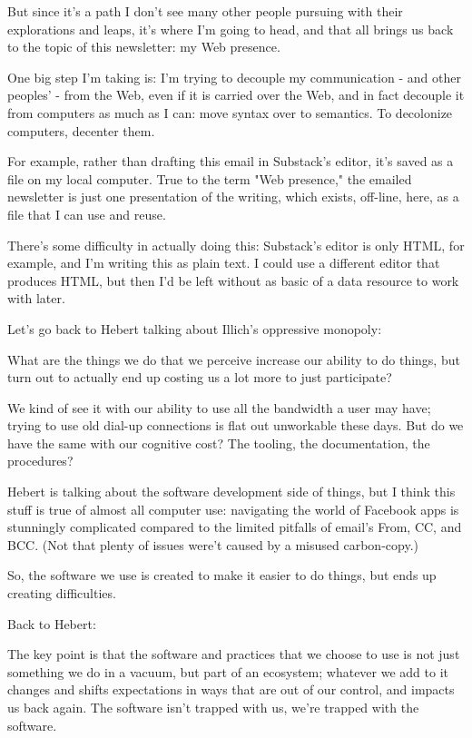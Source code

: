 \documentclass[11pt]{article}
\begin{document}
\begin{itemize}
But since it's a path I don't see many other people pursuing with their explorations and leaps, it's where I'm going to head, and that all brings us back to the topic of this newsletter: my Web presence.

One big step I'm taking is: I'm trying to decouple my communication - and other peoples' - from the Web, even if it is carried over the Web, and in fact decouple it from computers as much as I can: move syntax over to semantics. To decolonize computers, decenter them.

For example, rather than drafting this email in Substack's editor, it's saved as a file on my local computer. True to the term "Web presence," the emailed newsletter is just one presentation of the writing, which exists, off-line, here, as a file that I can use and reuse.

There's some difficulty in actually doing this: Substack's editor is only HTML, for example, and I'm writing this as plain text. I could use a different editor that produces HTML, but then I'd be left without as basic of a data resource to work with later.

Let's go back to Hebert talking about Illich's oppressive monopoly:

What are the things we do that we perceive increase our ability to do things, but turn out to actually end up costing us a lot more to just participate?

We kind of see it with our ability to use all the bandwidth a user may have; trying to use old dial-up connections is flat out unworkable these days. But do we have the same with our cognitive cost? The tooling, the documentation, the procedures?

Hebert is talking about the software development side of things, but I think this stuff is true of almost all computer use: navigating the world of Facebook apps is stunningly complicated compared to the limited pitfalls of email's From, CC, and BCC. (Not that plenty of issues were't caused by a misused carbon-copy.)

So, the software we use is created to make it easier to do things, but ends up creating difficulties.

Back to Hebert:

The key point is that the software and practices that we choose to use is not just something we do in a vacuum, but part of an ecosystem; whatever we add to it changes and shifts expectations in ways that are out of our control, and impacts us back again. The software isn't trapped with us, we're trapped with the software.


\end{itemize}
\end{document}

